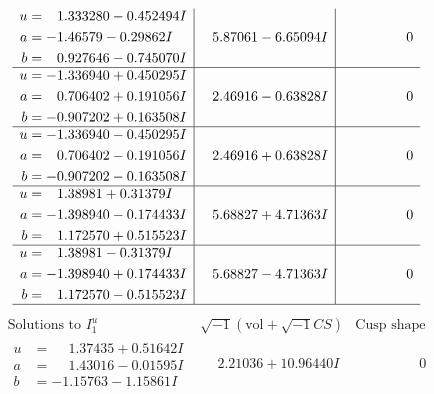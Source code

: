 \documentclass[1p]{elsarticle_modified}
\theoremstyle{definition}
\newcommand{\I}{\sqrt{-1}}
\begin{document}
$$\begin{array}{c|c|c}
\begin{aligned}
u &= \phantom{-}1.333280 - 0.452494 I \\
a &= -1.46579 - 0.29862 I \\
b &= \phantom{-}0.927646 - 0.745070 I\end{aligned}
 & \phantom{-}5.87061 - 6.65094 I & \phantom{-0.000000 } 0 \\ \hline\begin{aligned}
u &= -1.336940 + 0.450295 I \\
a &= \phantom{-}0.706402 + 0.191056 I \\
b &= -0.907202 + 0.163508 I\end{aligned}
 & \phantom{-}2.46916 - 0.63828 I & \phantom{-0.000000 } 0 \\ \hline\begin{aligned}
u &= -1.336940 - 0.450295 I \\
a &= \phantom{-}0.706402 - 0.191056 I \\
b &= -0.907202 - 0.163508 I\end{aligned}
 & \phantom{-}2.46916 + 0.63828 I & \phantom{-0.000000 } 0 \\ \hline\begin{aligned}
u &= \phantom{-}1.38981 + 0.31379 I \\
a &= -1.398940 - 0.174433 I \\
b &= \phantom{-}1.172570 + 0.515523 I\end{aligned}
 & \phantom{-}5.68827 + 4.71363 I & \phantom{-0.000000 } 0 \\ \hline\begin{aligned}
u &= \phantom{-}1.38981 - 0.31379 I \\
a &= -1.398940 + 0.174433 I \\
b &= \phantom{-}1.172570 - 0.515523 I\end{aligned}
 & \phantom{-}5.68827 - 4.71363 I & \phantom{-0.000000 } 0\\
 \hline 
 \end{array}$$\newpage$$\begin{array}{c|c|c}  
\text{Solutions to }I^u_{1}& \I (\text{vol} + \sqrt{-1}CS) & \text{Cusp shape}\\
 \hline 
\begin{aligned}
u &= \phantom{-}1.37435 + 0.51642 I \\
a &= \phantom{-}1.43016 - 0.01595 I \\
b &= -1.15763 - 1.15861 I\end{aligned}
 & \phantom{-}2.21036 + 10.96440 I & \phantom{-0.000000 } 0 \\ \hline\begin{aligned}

\end{aligned}
\end{array}$$
\end{document}
